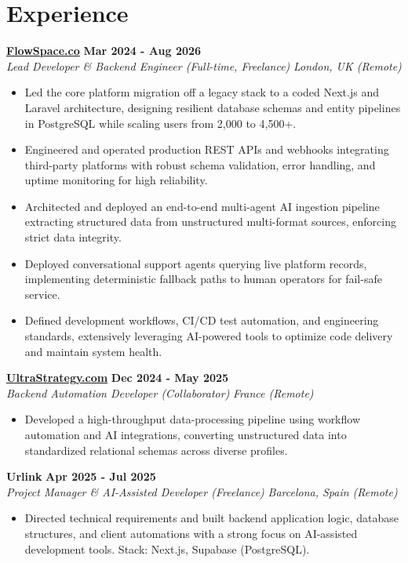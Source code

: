 \documentclass[a4paper,10pt]{article}
\newcommand{\role}[4]{%
 \textbf{#1} \hfill \textbf{#2}\\[1pt]%
 \textit{#3} \hfill \textit{#4}\\[2pt]%
}
\begin{document}
\section{Experience}

\role{\href{https://flowspace.co}{FlowSpace.co}}{Mar 2024 - Aug 2026}{Lead Developer \& Backend Engineer (Full-time, Freelance)}{London, UK (Remote)}
\begin{itemize}
 \item Led the core platform migration off a legacy stack to a coded Next.js and Laravel architecture, designing resilient database schemas and entity pipelines in PostgreSQL while scaling users from 2,000 to 4,500+.
 \item Engineered and operated production REST APIs and webhooks integrating third-party platforms with robust schema validation, error handling, and uptime monitoring for high reliability.
 \item Architected and deployed an end-to-end multi-agent AI ingestion pipeline extracting structured data from unstructured multi-format sources, enforcing strict data integrity.
 \item Deployed conversational support agents querying live platform records, implementing deterministic fallback paths to human operators for fail-safe service.
 \item Defined development workflows, CI/CD test automation, and engineering standards, extensively leveraging AI-powered tools to optimize code delivery and maintain system health.
\end{itemize}

\role{\href{https://ultrastrategy.com}{UltraStrategy.com}}{Dec 2024 - May 2025}{Backend Automation Developer (Collaborator)}{France (Remote)}
\begin{itemize}
 \item Developed a high-throughput data-processing pipeline using workflow automation and AI integrations, converting unstructured data into standardized relational schemas across diverse profiles.
\end{itemize}

\role{Urlink}{Apr 2025 - Jul 2025}{Project Manager \& AI-Assisted Developer (Freelance)}{Barcelona, Spain (Remote)}
\begin{itemize}
 \item Directed technical requirements and built backend application logic, database structures, and client automations with a strong focus on AI-assisted development tools. Stack: Next.js, Supabase (PostgreSQL).
\end{itemize}
\end{document}
